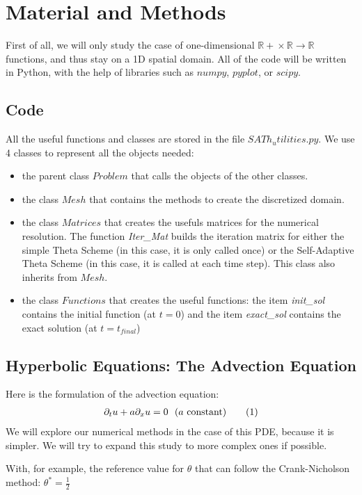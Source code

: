 \documentclass[12pt]{article}
\begin{document}
\section{Material and Methods}
First of all, we will only study the case of one-dimensional $\mathbb{R+} \times \mathbb{R} \rightarrow \mathbb{R}$ functions, and thus stay on a 1D spatial domain.
All of the code will be written in Python, with the help of libraries such as $numpy$, $pyplot$, or $scipy$.

\subsection{Code}
All the useful functions and classes are stored in the file $SATh_utilities.py$.
We use 4 classes to represent all the objects needed:
\begin{itemize}
    \item the parent class $Problem$ that calls the objects of the other classes.
    \item the class $Mesh$ that contains the methods to create the discretized domain.
    \item the class $Matrices$ that creates the usefuls matrices for the numerical resolution. The function \emph{Iter\_Mat}
builds the iteration matrix for either the simple Theta Scheme (in this case, it is only called once) or the Self-Adaptive Theta Scheme (in this case, it is called at each time step).
This class also inherits from $Mesh$.
    \item the class $Functions$ that creates the useful functions: the item \emph{init\_sol} contains the initial function (at $t=0$) and the item \emph{exact\_sol} contains the exact solution (at $t=t_{final}$)
\end{itemize}

\subsection{Hyperbolic Equations: The Advection Equation}
Here is the formulation of the advection equation:
\begin{align*}
    \partial_t u + a\partial_x u = 0 \text{\space \space ($a$ constant)} \tag{1}
\end{align*}
\vspace{10pt}
We will explore our numerical methods in the case of this PDE, because it is simpler. We will try to expand this study to more complex ones if possible.


With, for example, the reference value for $\theta$ that can follow the Crank-Nicholson method: $\theta^* = \frac{1}{2}$
\end{document}
